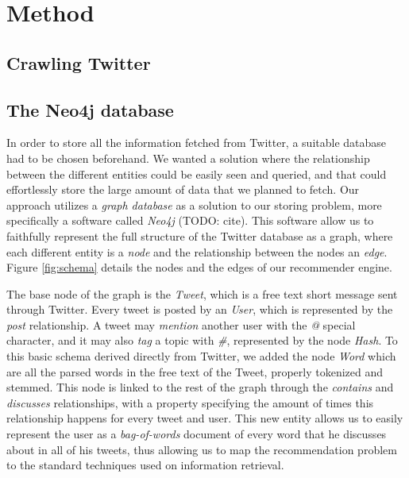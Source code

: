 \section{Method}
\label{sec:method}

\subsection{Crawling Twitter}

\subsection{The Neo4j database}

In order to store all the information fetched from Twitter, a suitable database had to be chosen beforehand. We wanted a solution where the relationship between the different entities could be easily seen and queried, and that could effortlessly store the large amount of data that we planned to fetch. Our approach utilizes a \emph{graph database} as a solution to our storing problem, more specifically a software called \emph{Neo4j} (TODO: cite). This software allow us to faithfully represent the full structure of the Twitter database as a graph, where each different entity is a \emph{node} and the relationship between the nodes an \emph{edge}. Figure \ref{fig:schema} details the nodes and the edges of our recommender engine.

The base node of the graph is the \emph{Tweet}, which is a free text short message sent through Twitter. Every tweet is posted by an \emph{User}, which is represented by the \emph{post} relationship. A tweet may \emph{mention} another user with the \emph{@} special character, and it may also \emph{tag} a topic with \emph{\#}, represented by the node \emph{Hash}. To this basic schema derived directly from Twitter, we added the node \emph{Word} which are all the parsed words in the free text of the Tweet, properly tokenized and stemmed. This node is linked to the rest of the graph through the \emph{contains} and \emph{discusses} relationships, with a property specifying the amount of times this relationship happens for every tweet and user. This new entity allows us to easily represent the user as a \emph{bag-of-words} document of every word that he discusses about in all of his tweets, thus allowing us to map the recommendation problem to the standard techniques used on information retrieval. 

